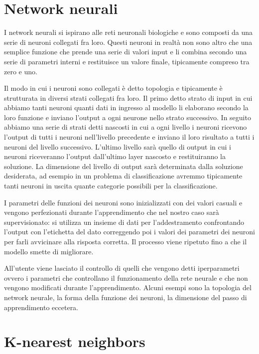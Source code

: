 \documentclass[a4paper,12pt]{report}
\begin{document}
\section{Network neurali}

I network neurali si ispirano alle reti neuronali biologiche e sono composti da
una serie di neuroni collegati fra loro. Questi neuroni in realtà non sono altro
che una semplice funzione che prende una serie di valori input e li combina
secondo una serie di parametri interni e restituisce un valore finale,
tipicamente compreso tra zero e uno. 

Il modo in cui i neuroni sono collegati è detto topologia e tipicamente è
strutturata in diversi strati collegati fra loro. Il primo detto strato di input
in cui abbiamo tanti neuroni quanti dati in ingresso al modello li elaborano
secondo la loro funzione e inviano l'output a ogni neurone nello strato
successivo. In seguito abbiamo una serie di strati detti nascosti in cui a ogni
livello i neuroni ricevono l'output di tutti i neuroni nell'livello precedente e
inviano il loro risultato a tutti i neuroni del livello successivo. L'ultimo
livello sarà quello di output in cui i neuroni riceveranno l'output dall'ultimo 
layer nascosto e restituiranno la soluzione. La dimensione del livello di output
sarà determinata dalla soluzione desiderata, ad esempio in un problema di
classificazione avremmo tipicamente tanti neuroni in uscita quante categorie
possibili per la classificazione.

I parametri delle funzioni dei neuroni sono inizializzati con dei valori casuali e
vengono perfezionati durante l'apprendimento che nel nostro caso sarà
supervisionato: si utilizza un insieme di dati per l'addestramento confrontando
l'output con l'etichetta del dato correggendo poi i valori dei parametri dei
neuroni per farli avvicinare alla risposta corretta. Il processo viene ripetuto
fino a che il modello smette di migliorare.

All'utente viene lasciato il controllo di quelli che vengono detti iperparametri
ovvero i parametri che controllano il funzionamento della rete neurale e che non
vengono modificati durante l'apprendimento. Alcuni esempi sono la topologia del
network neurale, la forma della funzione dei neuroni, la dimensione del passo di
apprendimento eccetera.

\section{K-nearest neighbors}
\end{document}
